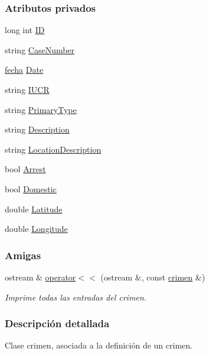 \subsubsection*{Atributos privados}
\begin{DoxyCompactItemize}
\item 
long int \hyperlink{classcrimen_a59702f88f0b0c25781ae3d296790dcb8}{I\+D}
\item 
string \hyperlink{classcrimen_a710fbf07b3e543c2a1b2e625b144050a}{Case\+Number}
\item 
\hyperlink{classfecha}{fecha} \hyperlink{classcrimen_a43fdb792dbc2e2927592fad7fb8b224c}{Date}
\item 
string \hyperlink{classcrimen_a064e0e02109feaea19f254ef47a2510c}{I\+U\+C\+R}
\item 
string \hyperlink{classcrimen_acc4a8a9f688d306a38519899a8c325a7}{Primary\+Type}
\item 
string \hyperlink{classcrimen_aa51b9ddc58248aadefdb8fad7d4cd69b}{Description}
\item 
string \hyperlink{classcrimen_a221f7065c470883388174f19ea34d1f3}{Location\+Description}
\item 
bool \hyperlink{classcrimen_acf24dca899efd9bf99574f3be0b5ce52}{Arrest}
\item 
bool \hyperlink{classcrimen_a53f0bfea0c8ebb03dda9bf7332057477}{Domestic}
\item 
double \hyperlink{classcrimen_adaf728df1dacff5a93678d3feb512b7f}{Latitude}
\item 
double \hyperlink{classcrimen_a9ffd3c64d12cc4b963b890b8db645964}{Longitude}
\end{DoxyCompactItemize}
\subsubsection*{Amigas}
\begin{DoxyCompactItemize}
\item 
ostream \& \hyperlink{classcrimen_a70d7dbf132d06cb3c889042765a7da2e}{operator$<$$<$} (ostream \&, const \hyperlink{classcrimen}{crimen} \&)
\begin{DoxyCompactList}\small\item\em Imprime todas las entradas del crimen. \end{DoxyCompactList}\end{DoxyCompactItemize}


\subsubsection{Descripción detallada}
Clase crimen, asociada a la definición de un crimen. 

